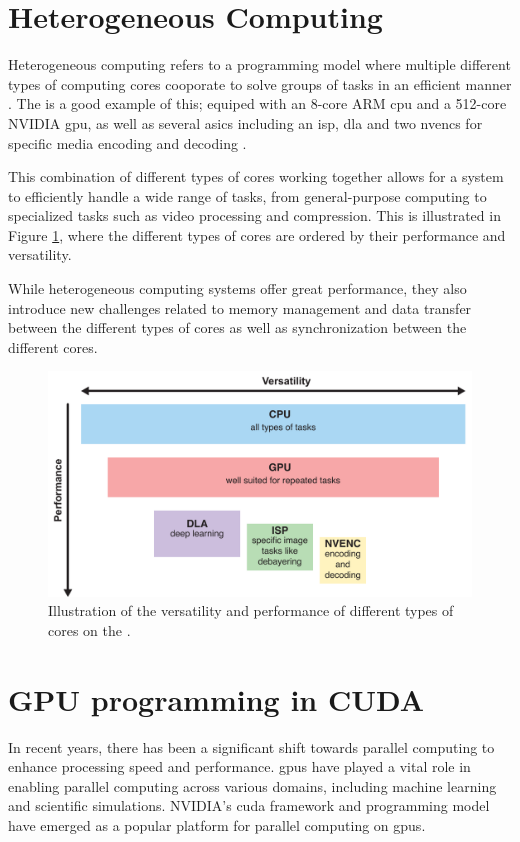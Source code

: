 \section{Heterogeneous Computing}
Heterogeneous computing refers to a programming model where multiple different types of computing cores cooporate to solve groups of tasks in an efficient manner \cite{armWhatHeterogenousCompute}.
The \jx is a good example of this; equiped with an 8-core ARM \gls{cpu} and a 512-core NVIDIA \gls{gpu}, as well as several \glspl{asic} including an \gls{isp}, \gls{dla} and two \glspl{nvenc} for specific media encoding and decoding \cite[9, 8, 23, 15-22]{nvidiaNVIDIAJetsonAGX2019}.

This combination of different types of cores working together allows for a system to efficiently handle a wide range of tasks, from general-purpose computing to specialized tasks such as video processing and compression.
This is illustrated in Figure \ref{fig:jx_hierarchy}, where the different types of cores are ordered by their performance and versatility.

While heterogeneous computing systems offer great performance, they also introduce new challenges related to memory management and data transfer between the different types of cores as well as synchronization between the different cores.

\begin{figure}[H]
    \centering
    \includegraphics[width=.8\textwidth]{figures/PDF/jx_hierarchy.pdf}
    \caption{Illustration of the versatility and performance of different types of cores on the \jx.}
    \label{fig:jx_hierarchy}
\end{figure}


\section{GPU programming in CUDA}
In recent years, there has been a significant shift towards parallel computing to enhance processing speed and performance.
\glspl{gpu} have played a vital role in enabling parallel computing across various domains, including machine learning and scientific simulations.
NVIDIA's \gls{cuda} framework and programming model have emerged as a popular platform for parallel computing on \glspl{gpu}.


